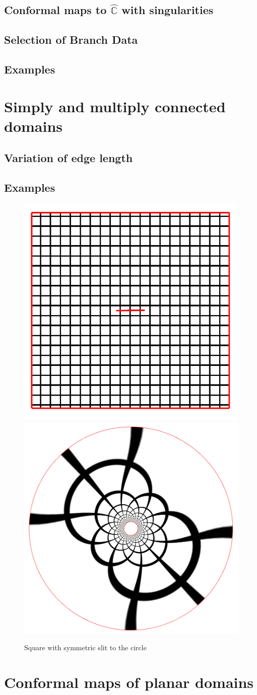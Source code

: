 \documentclass{book}
\begin{document}
\subsection{Conformal maps to $\hat{\mathbb{C}}$ with singularities}
\subsection{Selection of Branch Data}
\subsection{Examples}

\section{Simply and multiply connected domains}
\label{sec:planar_domains}
\subsection{Variation of edge length}
\subsection{Examples}
\begin{figure}
	\centering
	\includegraphics[width=0.3\linewidth]{image/slit_domain/domain_grid.png}
	\includegraphics[width=0.3\linewidth]{image/slit_domain/image_grid.png}
	\caption{Square with symmetric slit to the circle}
	\label{fig:slit_circle}
\end{figure}


\section{Conformal maps of planar domains}
\end{document}
